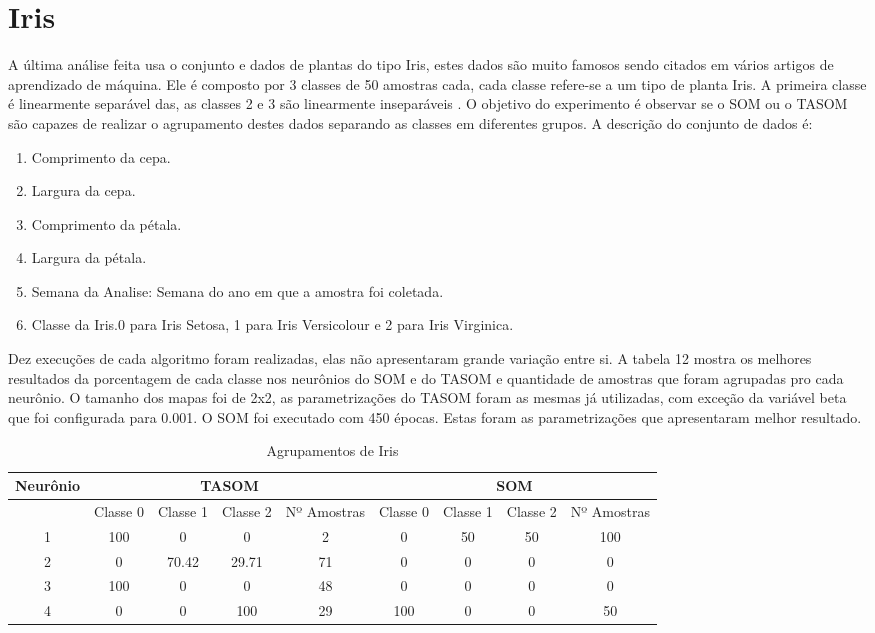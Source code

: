 \section{Iris} 
A última análise feita usa o conjunto e dados de plantas do tipo Iris, estes dados são muito famosos sendo citados em vários artigos de aprendizado de máquina. Ele é composto por 3 classes de 50 amostras cada, cada classe refere-se a um tipo de planta Iris. A primeira classe é linearmente separável das, as classes 2 e 3 são linearmente inseparáveis \cite{iris}. O objetivo do experimento é observar se o SOM ou o TASOM são capazes de realizar o agrupamento destes dados separando as classes em diferentes grupos. A descrição do conjunto de dados é:

\begin{enumerate}
\item Comprimento da cepa.
\item Largura da cepa.
\item Comprimento da pétala.
\item Largura da pétala.
\item Semana da Analise: Semana do ano em que a amostra foi coletada.
\item Classe da Iris.0 para Iris Setosa, 1 para  Iris Versicolour e 2 para Iris Virginica.
\end{enumerate}

Dez execuções de cada algoritmo foram realizadas, elas não apresentaram grande variação entre si. A tabela 12 mostra os melhores resultados da porcentagem de cada classe nos neurônios do SOM e do TASOM e quantidade de amostras que foram agrupadas pro cada neurônio. O tamanho dos mapas foi de 2x2, as parametrizações do TASOM foram as mesmas já utilizadas, com exceção da variável beta que foi configurada para 0.001. O SOM foi executado com 450 épocas. Estas foram as parametrizações que apresentaram melhor resultado.

\begin{table}[h]
\centering
\caption{Agrupamentos de Iris}
\label{my-label}
\begin{tabular}{|c|c|c|c|c|c|c|c|c|}
\hline
Neurônio & \multicolumn{4}{c|}{TASOM}                   & \multicolumn{4}{c|}{SOM}                     \\ \hline
         & Classe 0 & Classe 1 & Classe 2 & Nº Amostras & Classe 0 & Classe 1 & Classe 2 & Nº Amostras \\ \hline
1        & 100      & 0        & 0        & 2           & 0        & 50       & 50       & 100         \\ \hline
2        & 0        & 70.42    & 29.71    & 71          & 0        & 0        & 0        & 0           \\ \hline
3        & 100      & 0        & 0        & 48          & 0        & 0        & 0        & 0           \\ \hline
4        & 0        & 0        & 100      & 29          & 100      & 0        & 0        & 50          \\ \hline
\end{tabular}
\end{table} 
 
